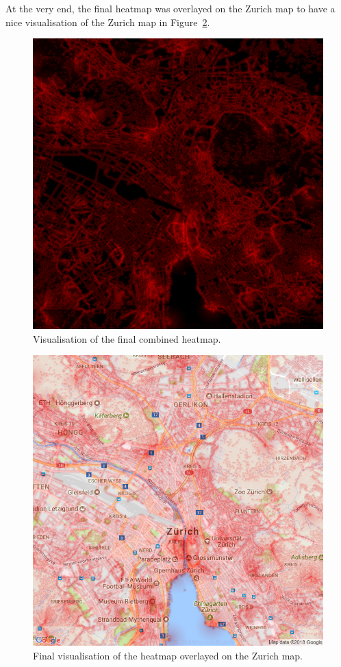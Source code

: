 \documentclass[letterpaper]{article}
\begin{document}
\indent At the very end, the final heatmap was overlayed on the Zurich map to have a nice visualisation of the Zurich map in Figure~\ref{fig:ZurichVisualization}.


\begin{figure}[H]
    \centering
    \includegraphics[width=.9\linewidth]{images/combined_heatmap.png}
    \caption{Visualisation of the final combined heatmap.}
    \label{fig:ZurichAllHeatmaps}
\end{figure}

\begin{figure}[H]
    \centering
     \includegraphics[width=.9\linewidth]{images/combined.png}
    \caption{Final visualisation of the heatmap overlayed on the Zurich map.}
    \label{fig:ZurichVisualization}
\end{figure}
\end{document}
